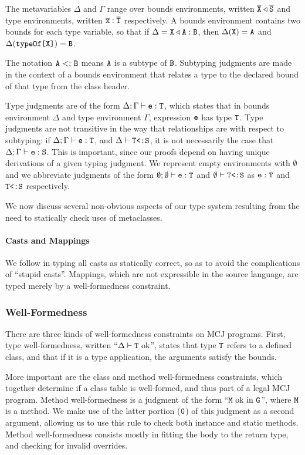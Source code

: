 \documentclass[10pt]{acm-sigplan}
\begin{document}
The metavariables $\Delta$ and $\Gamma$ range over bounds
environments, written ${\overline{{\mbox {\tt X}}}} \triangleleft {\overline{{\mbox {\tt S}}}}$ and type environments,
written ${{\overline{{\mbox {\tt x}}}}} : {{\overline{{\mathtt{{T}}}}}}$ respectively.  A bounds environment contains
two bounds for each type variable, so that if $\Delta = \mbox {\tt X} \triangleleft
\mbox {\tt A} : \mbox {\tt B}$, then $\Delta(\mbox {\tt X}) = \mbox {\tt A}$ and $\Delta({\mathtt{{typeOf}}{\mbox{\tt [}}\mbox {\tt X}\mbox{{\tt ]}}}) = \mbox {\tt B}$.

The notation $\mbox {\tt A} {\ <:\ } \mbox {\tt B}$ means $\mbox {\tt A}$ is a subtype of $\mbox {\tt B}$.
Subtyping judgments are made in the context of a bounds environment
that relates a type to the declared bound of that type from the class
header.

Type judgments are of the form ${\Delta;\Gamma} \vdash {\ensuremath{{\mbox {\tt e}} : {\mathtt{{T}}}}}$, which states
that in bounds environment $\Delta$ and type environment $\Gamma$,
expression $\mbox {\tt e}$ has type $\mathtt{{T}}$.  Type judgments are not transitive in
the way that {} relationships are with respect to
subtyping: if ${\Delta;\Gamma} \vdash {\ensuremath{{\mbox {\tt e}} : {\mathtt{{T}}}}}$, and ${\Delta} \vdash {\ensuremath{{\mathtt{{T}}} \mbox{\tt <:} {\mbox {\tt S}}}}$, it is not necessarily the case that ${\Delta;\Gamma} \vdash {\ensuremath{{\mbox {\tt e}} : {\mbox {\tt S}}}}$.
This is important, since our proofs depend on having unique
derivations of a given typing judgment. We represent empty
environments with $\emptyset$ and we abbreviate judgments of the form
${\emptyset;\emptyset} \vdash {\ensuremath {{\mbox {\tt e}} : {\mathtt{{T}}}}}$ and ${\emptyset} \vdash {\ensuremath {{\mathtt{{T}}} \mbox{\tt <:} {\mbox {\tt S}}}}$ as ${{\mbox {\tt e}} : {\mathtt{{T}}}}$ and ${{\mathtt{{T}}} \mbox{\tt <:} {\mbox {\tt S}}}$ respectively.

We now discuss several non-obvious aspects of our type system
resulting from the need to statically check uses of metaclasses.


\paragraph{Casts and Mappings}
We follow \cite{MixGen} in typing all casts as statically correct, so as to
avoid the complications of ``stupid casts''.  Mappings, which are not
expressible in the source language, are typed merely by a
well-formedness constraint.

\subsubsection{Well-Formedness}

There are three kinds of well-formedness constraints on MCJ
programs.  First, type well-formedness, written ``${\Delta} \vdash {\ensuremath{\mathtt{{T}}}} \mbox{\textrm {\ ok}}$'',
states that type $\mathtt{{T}}$ refers to a defined class, and that if it is a type
application, the arguments satisfy the bounds.

More important are the class and method well-formedness constraints,
which together determine if a class table is well-formed, and thus
part of a legal MCJ program.  Method well-formedness is a
judgment of the form ``$\mbox {\tt M} \mbox{\ ok in}\ \mathtt{{G}}$'', where $\mbox {\tt M}$ is a method.  We make
use of the latter portion ($\mathtt{{G}}$) of this judgment as a second argument,
allowing us to use this rule to check both instance and static methods.
Method well-formedness consists mostly in fitting the body to the
return type, and checking for invalid overrides.
\end{document}
